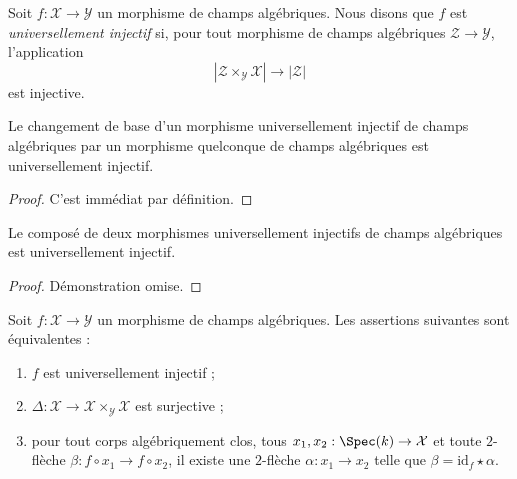 \begin{definition}
\label{definition-universally-injective}
Soit $f : \mathcal{X} \to \mathcal{Y}$ un morphisme de champs algébriques.
Nous disons que $f$ est {\it universellement injectif} si, pour tout
morphisme de champs algébriques $\mathcal{Z} \to \mathcal{Y}$,
l'application
$$
|\mathcal{Z} \times_\mathcal{Y} \mathcal{X}| \to |\mathcal{Z}|
$$
est injective.
\end{definition}

\begin{lemma}
\label{lemma-base-change-universally-injective}
Le changement de base d'un morphisme universellement injectif de champs
algébriques par un morphisme quelconque de champs algébriques est
universellement injectif.
\end{lemma}

\begin{proof}
C'est immédiat par définition.
\end{proof}

\begin{lemma}
\label{lemma-composition-universally-injective}
Le composé de deux morphismes universellement injectifs de champs
algébriques est universellement injectif.
\end{lemma}

\begin{proof}
Démonstration omise.
\end{proof}

\begin{lemma}
\label{lemma-universally-injective}
Soit $f : \mathcal{X} \to \mathcal{Y}$ un morphisme de champs algébriques.
Les assertions suivantes sont équivalentes :
\begin{enumerate}
\item $f$ est universellement injectif ;
\item $\Delta : \mathcal{X} \to \mathcal{X} \times_\mathcal{Y} \mathcal{X}$
est surjective ;
\item pour tout corps algébriquement clos, tous
$x_1, x_2 : \Spec(k) \to \mathcal{X}$ et toute $2$-flèche
$\beta : f \circ x_1 \to f \circ x_2$, il existe une
$2$-flèche $\alpha : x_1 \to x_2$ telle que
$\beta = \text{id}_f \star \alpha$.
\end{enumerate}
\end{lemma}

